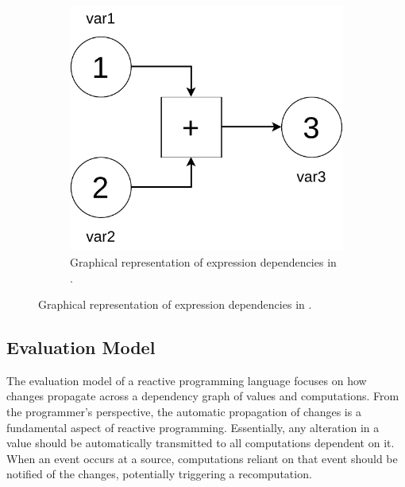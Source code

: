 \begin{figure}[ht!]
    \centering
    \begin{subfigure}[b]{\textwidth}
        \centering
        
    \end{subfigure}
    \hfill
    \begin{subfigure}[b]{0.5\textwidth}
        \centering
        \includegraphics[width=\linewidth]{figures/reactive-example.pdf}
            \caption{Graphical representation of expression dependencies in .}
    \end{subfigure}
\end{figure}

\subsection{Evaluation Model}

The evaluation model of a reactive programming language focuses on how changes propagate across a dependency graph of values and computations. From the programmer's perspective, the automatic propagation of changes is a fundamental aspect of reactive programming. Essentially, any alteration in a value should be automatically transmitted to all computations dependent on it. When an event occurs at a source, computations reliant on that event should be notified of the changes, potentially triggering a recomputation.

